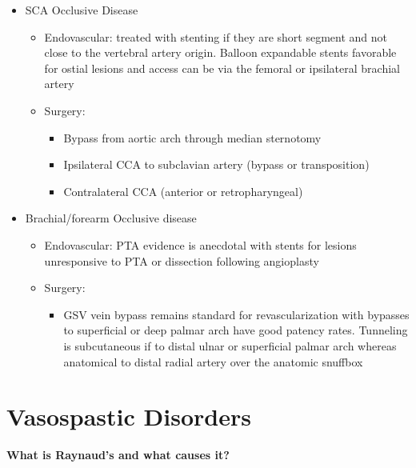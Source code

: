 \documentclass[
]{book}
\providecommand{\tightlist}{%
  \setlength{\itemsep}{0pt}\setlength{\parskip}{0pt}}
\begin{document}
\begin{itemize}
\item
  SCA Occlusive Disease

  \begin{itemize}
  \item
    Endovascular: treated with stenting if they are short segment
    and not close to the vertebral artery origin. Balloon expandable
    stents favorable for ostial lesions and access can be via the
    femoral or ipsilateral brachial artery~
  \item
    Surgery:

    \begin{itemize}
    \item
      Bypass from aortic arch through median sternotomy~
    \item
      Ipsilateral CCA to subclavian artery (bypass or
      transposition)~
    \item
      Contralateral CCA (anterior or retropharyngeal)
    \end{itemize}
  \end{itemize}
\item
  Brachial/forearm Occlusive disease~

  \begin{itemize}
  \item
    Endovascular: PTA evidence is anecdotal with stents for lesions
    unresponsive to PTA or dissection following angioplasty~
  \item
    Surgery:~

    \begin{itemize}
    \tightlist
    \item
      GSV vein bypass remains standard for revascularization with
      bypasses to superficial or deep palmar arch have good
      patency rates. Tunneling is subcutaneous if to distal ulnar
      or superficial palmar arch whereas anatomical to distal
      radial artery over the anatomic snuffbox~
    \end{itemize}
  \end{itemize}
\end{itemize}

\hypertarget{vasospastic-disorders}{%
\section{Vasospastic Disorders}\label{vasospastic-disorders}}

\textbf{What is Raynaud's and what causes it?} \citep{shuja117UpperExtremity, landry141RaynaudPhenomenon2019}
\end{document}
